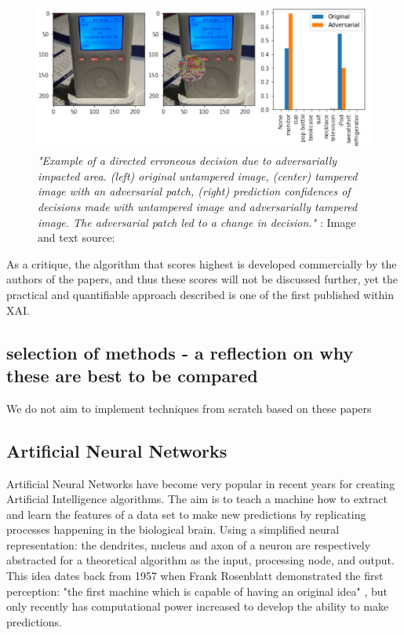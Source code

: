 \documentclass[proposal]{softeng}
\begin{document}
\begin{figure}[h!]
\centering

\includegraphics[width=.8\textwidth]{images/decision_change.png}

\caption{\textit{"Example of a directed erroneous decision due to adversarially impacted area. (left) original
untampered image, (center) tampered image with an adversarial patch, (right) prediction confidences
of decisions made with untampered image and adversarially tampered image. The adversarial patch
led to a change in decision." }: Image and text source: \cite{LinZhongQiu2019DERD}}

\label{fig:decision_change}
\end{figure}

As a critique, the algorithm that scores highest is developed commercially by the authors of the papers, and thus these scores will not be discussed further, yet the practical and quantifiable approach described is one of the first published within XAI.


\subsection{ selection of methods - a reflection on why these are best to be compared}
We do not aim to implement techniques from scratch based on these papers

\subsection{Artificial Neural Networks}

Artificial Neural Networks have become very popular in recent years for creating Artificial Intelligence algorithms. The aim is to teach a machine how to extract and learn the features of a data set to make new predictions by replicating processes happening in the biological brain. Using a simplified neural representation: the dendrites, nucleus and axon of a neuron are respectively abstracted for a theoretical algorithm as the input, processing node, and output. This idea dates back from 1957 when Frank Rosenblatt demonstrated the first perception: "the first machine which is capable of having an original idea" \cite{rosenblatt}, but only recently has computational power increased to develop the ability to make predictions.
\end{document}
